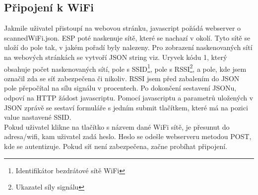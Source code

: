 \documentclass[a4paper, 12pt]{report}
\begin{document}
    \subsection{Připojení k WiFi}
    Jakmile uživatel přistoupí na webovou stránku, javascript požádá webserver o scannedWiFi.json. ESP poté naskenuje sítě, které se nachazí v okolí. Tyto sítě se uloží do pole tak, v jakém pořadí byly nalezeny. Pro zobrazení naskenovaných sítí na webových stránkách se vytvoří JSON string viz. Uryvek kódu 1, který obsahuje počet naskenovaných sítí, pole s SSID\footnote{Identifikátor bezdrátové sítě WiFi}, pole s RSSI\footnote{Ukazatel síly signálu}, a pole, kde jsem označil zda se síť zabezpečena či nikoliv. RSSI jsem před zabalením do JSON pole přepočítal na sílu signálu v procentech. Po dokončení sestavení JSONu, odpoví na HTTP žádost javascriptu. Pomocí javascriptu a parametrů uložených v JSON zprávě se sestaví formuláře s jedním submit tlačítkem, které má na pozici value nastavené SSID.\\
    Pokud uživatel klikne na tlačítko s názvem dané WiFi sítě, je přesunut do adresa/wifi, kam uživatel zadá heslo. Heslo se odešle webserveru metodou POST, kde se autentizuje. Pokud síť není zabezpečena, začne probíhat připojení.
\end{document}
